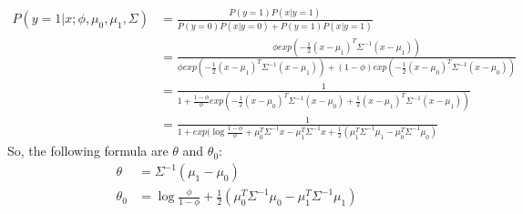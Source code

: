 \begin{answer}
\begin{align*}
    P(y=1|x;\phi, \mu_0, \mu_1, \Sigma) &= \frac{P(y=1)P(x|y=1)}{P(y=0)P(x|y=0)+P(y=1)P(x|y=1)}\\
    &= \frac{\phi exp(-\frac{1}{2}(x-\mu_1)^T\Sigma^{-1}(x-\mu_1))}{\phi exp(-\frac{1}{2}(x-\mu_1)^T\Sigma^{-1}(x-\mu_1)) + (1 - \phi) exp(-\frac{1}{2}(x-\mu_0)^T\Sigma^{-1}(x-\mu_0))}\\
    &= \frac{1}{1 + \frac{1-\phi}{\phi}exp(-\frac{1}{2}(x-\mu_0)^T\Sigma^{-1}(x-\mu_0)+\frac{1}{2}(x-\mu_1)^T\Sigma^{-1}(x-\mu_1))}\\
    &=\frac{1}{1+exp(\log\frac{1-\phi}{\phi} + \mu_0^T\Sigma^{-1}x - \mu_1^T\Sigma^{-1}x + \frac{1}{2}(\mu_1^T\Sigma^{-1}\mu_1 - \mu_0^T\Sigma^{-1}\mu_0)}
\end{align*}
So, the following formula are $\theta$ and $\theta_0$:
\begin{align*}
    \theta &= \Sigma^{-1}(\mu_1-\mu_0)\\
    \theta_0 &= \log\frac{\phi}{1 - \phi} + \frac{1}{2}(\mu_0^T\Sigma^{-1}\mu_0 - \mu_1^T\Sigma^{-1}\mu_1)
\end{align*}
\end{answer}
